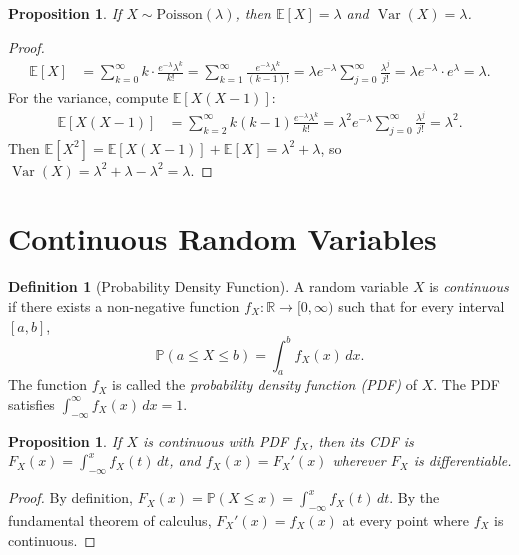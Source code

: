 \documentclass[11pt,a4paper]{article}
\theoremstyle{definition}
\newtheorem{definition}{Definition}[section]
\theoremstyle{plain}
\newtheorem{proposition}[theorem]{Proposition}
\theoremstyle{remark}
\newcommand{\R}{\mathbb{R}}
\newcommand{\E}{\mathbb{E}}
\newcommand{\Prob}{\mathbb{P}}
\DeclareMathOperator{\Var}{Var}
\begin{document}
\begin{proposition}
\label{prop:poisson_moments}
If $X \sim \mathrm{Poisson}(\lambda)$, then $\E[X] = \lambda$ and $\Var(X) = \lambda$.
\end{proposition}

\begin{proof}
\begin{align*}
    \E[X] &= \sum_{k=0}^\infty k \cdot \frac{e^{-\lambda}\lambda^k}{k!}
    = \sum_{k=1}^\infty \frac{e^{-\lambda}\lambda^k}{(k-1)!}
    = \lambda e^{-\lambda} \sum_{j=0}^\infty \frac{\lambda^j}{j!}
    = \lambda e^{-\lambda} \cdot e^{\lambda} = \lambda.
\end{align*}
For the variance, compute $\E[X(X-1)]$:
\begin{align*}
    \E[X(X-1)] &= \sum_{k=2}^\infty k(k-1)\frac{e^{-\lambda}\lambda^k}{k!}
    = \lambda^2 e^{-\lambda} \sum_{j=0}^\infty \frac{\lambda^j}{j!} = \lambda^2.
\end{align*}
Then $\E[X^2] = \E[X(X-1)] + \E[X] = \lambda^2 + \lambda$, so
$\Var(X) = \lambda^2 + \lambda - \lambda^2 = \lambda$.
\end{proof}

\section{Continuous Random Variables}
\label{sec:continuous_rv}

\begin{definition}[Probability Density Function]
\label{def:pdf}
A random variable $X$ is \emph{continuous} if there exists a non-negative function
$f_X \colon \R \to [0, \infty)$ such that for every interval $[a, b]$,
\[
    \Prob(a \leq X \leq b) = \int_a^b f_X(x)\,dx.
\]
The function $f_X$ is called the \emph{probability density function (PDF)} of $X$. The PDF
satisfies $\int_{-\infty}^\infty f_X(x)\,dx = 1$.
\end{definition}

\begin{proposition}
\label{prop:cdf_pdf}
If $X$ is continuous with PDF $f_X$, then its CDF is $F_X(x) = \int_{-\infty}^x f_X(t)\,dt$,
and $f_X(x) = F_X'(x)$ wherever $F_X$ is differentiable.
\end{proposition}

\begin{proof}
By definition, $F_X(x) = \Prob(X \leq x) = \int_{-\infty}^x f_X(t)\,dt$. By the
fundamental theorem of calculus, $F_X'(x) = f_X(x)$ at every point where $f_X$ is
continuous.
\end{proof}
\end{document}

